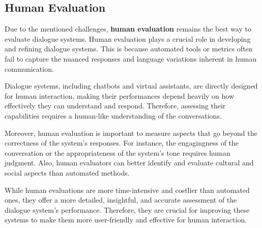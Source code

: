 \subsection{Human Evaluation}
Due to the mentioned challenges, \textbf{human evaluation} remains the best way to evaluate dialogue systems.
Human evaluation plays a crucial role in developing and refining dialogue systems. This is because automated tools or metrics often fail to capture the nuanced responses and language variations inherent in human communication. 

Dialogue systems, including chatbots and virtual assistants, are directly designed for human interaction, making their performances depend heavily on how effectively they can understand and respond.
Therefore, assessing their capabilities requires a human-like understanding of the conversations.

Moreover, human evaluation is important to measure aspects that go beyond the correctness of the system's responses. For instance, the engagingness of the conversation or the appropriateness of the system's tone requires human judgment. Also, human evaluators can better identify and evaluate cultural and social aspects than automated methods.

While human evaluations are more time-intensive and costlier than automated ones, they offer a more detailed, insightful, and accurate assessment of the dialogue system's performance.
Therefore, they are crucial for improving these systems to make them more user-friendly and effective for human interaction.